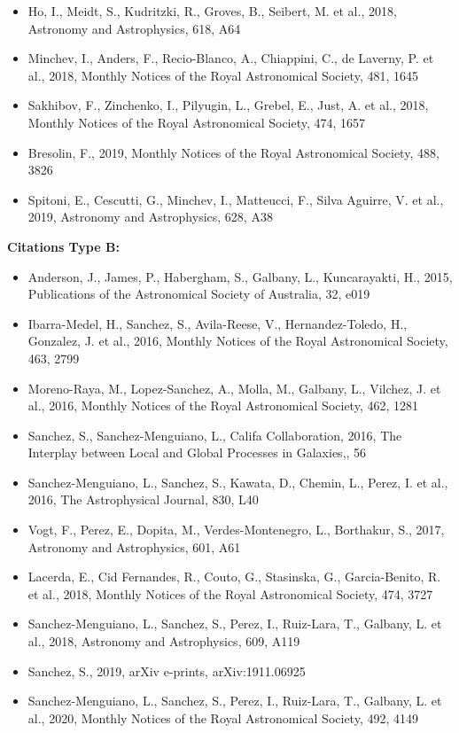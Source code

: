 \documentclass{letter}
\begin{document}
\begin{enumerate}
\begin{itemize}
\item Ho, I., Meidt, S., Kudritzki, R., Groves, B., Seibert, M. et al., 2018, Astronomy and Astrophysics, 618, A64
\item Minchev, I., Anders, F., Recio-Blanco, A., Chiappini, C., de Laverny, P. et al., 2018, Monthly Notices of the Royal Astronomical Society, 481, 1645
\item Sakhibov, F., Zinchenko, I., Pilyugin, L., Grebel, E., Just, A. et al., 2018, Monthly Notices of the Royal Astronomical Society, 474, 1657
\item Bresolin, F., 2019, Monthly Notices of the Royal Astronomical Society, 488, 3826
\item Spitoni, E., Cescutti, G., Minchev, I., Matteucci, F., Silva Aguirre, V. et al., 2019, Astronomy and Astrophysics, 628, A38
\end{itemize}
{\bf Citations Type B:}
\begin{itemize}
\item Anderson, J., James, P., Habergham, S., Galbany, L., Kuncarayakti, H., 2015, Publications of the Astronomical Society of Australia, 32, e019
\item Ibarra-Medel, H., Sanchez, S., Avila-Reese, V., Hernandez-Toledo, H., Gonzalez, J. et al., 2016, Monthly Notices of the Royal Astronomical Society, 463, 2799
\item Moreno-Raya, M., Lopez-Sanchez, A., Molla, M., Galbany, L., Vilchez, J. et al., 2016, Monthly Notices of the Royal Astronomical Society, 462, 1281
\item Sanchez, S., Sanchez-Menguiano, L., Califa Collaboration, 2016, The Interplay between Local and Global Processes in Galaxies,, 56
\item Sanchez-Menguiano, L., Sanchez, S., Kawata, D., Chemin, L., Perez, I. et al., 2016, The Astrophysical Journal, 830, L40
\item Vogt, F., Perez, E., Dopita, M., Verdes-Montenegro, L., Borthakur, S., 2017, Astronomy and Astrophysics, 601, A61
\item Lacerda, E., Cid Fernandes, R., Couto, G., Stasinska, G., Garcia-Benito, R. et al., 2018, Monthly Notices of the Royal Astronomical Society, 474, 3727
\item Sanchez-Menguiano, L., Sanchez, S., Perez, I., Ruiz-Lara, T., Galbany, L. et al., 2018, Astronomy and Astrophysics, 609, A119
\item Sanchez, S., 2019, arXiv e-prints, arXiv:1911.06925
\item Sanchez-Menguiano, L., Sanchez, S., Perez, I., Ruiz-Lara, T., Galbany, L. et al., 2020, Monthly Notices of the Royal Astronomical Society, 492, 4149

\end{itemize}
\end{enumerate}
\end{document}
